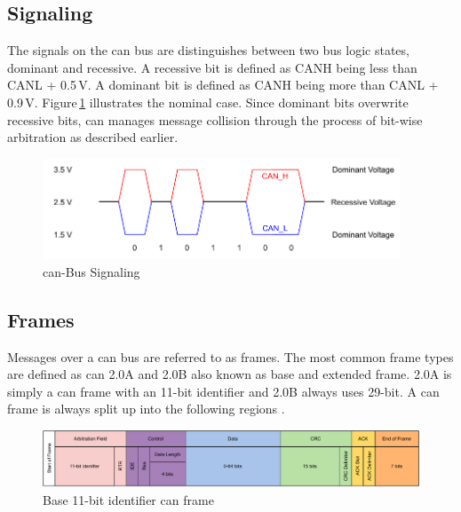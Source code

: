 \subsection{Signaling}
The signals on the \acrshort{can} bus are distinguishes between two bus logic states, dominant and recessive. A recessive bit is defined as CANH being less than CANL + 0.5\,V. A dominant bit is defined as CANH being more than CANL + 0.9\,V. Figure\,\ref{fig:can-signaling} illustrates the nominal case. Since dominant bits overwrite recessive bits, \acrshort{can} manages message collision through the process of bit-wise arbitration as described earlier.

\begin{figure}[h!]
	\centering
	\includegraphics[height=3cm]{images/can-signaling}
	\caption{\acrshort{can}-Bus Signaling}
	\label{fig:can-signaling}
\end{figure}

\subsection{Frames}
Messages over a \acrshort{can} bus are referred to as frames. The most common frame types are defined as \acrshort{can} 2.0A and 2.0B also known as base and extended frame. 2.0A is simply a \acrshort{can} frame with an 11-bit identifier and 2.0B always uses 29-bit. A \acrshort{can} frame is always split up into the following regions \cite{can_bus_tutorial}.

\begin{figure}[h!]
	\centering
	\includegraphics[width=\textwidth]{images/can-frame}
	\caption{Base 11-bit identifier \acrshort{can} frame}
	\label{fig:can-frame}
\end{figure}

